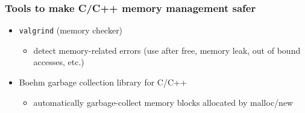 \documentclass[12pt,dvipdfmx]{beamer}
\newif\ifja
\newif\ifeng
\newcommand{\ao}[1]{{\color{blue}#1}}
\begin{document}
\begin{frame}
  \frametitle{Tools to make C/C++ memory management safer}
  \begin{itemize}
  \item \ao{\tt valgrind} (memory checker)
    \begin{itemize}
    \item detect memory-related errors (use after free, memory leak, out of bound accesses, etc.)
    \end{itemize}
  \item Boehm garbage collection library for C/C++
    \begin{itemize}
    \item automatically garbage-collect memory blocks allocated by malloc/new
    \end{itemize}
  \end{itemize}
\end{frame}
\fi


\iffalse
\ifja
\begin{frame}[fragile]
\frametitle{起きうる間違い}
\begin{itemize}
\item 寿命を超えて変数をアクセスする
\item ヒープから割り当てた変数を開放し忘れる\ao{(メモリリーク)}
\end{itemize}
\end{frame}
\fi
\ifeng
\begin{frame}[fragile]
\frametitle{How they can go wrong}
\begin{itemize}
\item access an object beyond its lifetime 
\item forget to release/reclaim
  an object \ao{(memory leak)}
\end{itemize}
\end{frame}
\fi
\fi
\end{document}
